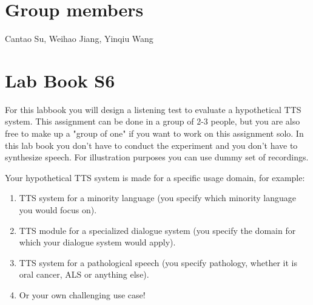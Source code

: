 \documentclass{../labbook}
\begin{document}
\section{Group members}
Cantao Su, Weihao Jiang, Yinqiu Wang

\section{Lab Book S6}
\noindent 
For this labbook you will design a listening test to evaluate a hypothetical TTS system. This assignment can be done in a group of 2-3 people, but you are also free to make up a "group of one" if you want to work on this assignment solo.
In this lab book you don't have to conduct the experiment and you don't have to synthesize speech. For illustration purposes you can use dummy set of recordings. 
\bigskip

\noindent Your hypothetical TTS system is made for a specific usage domain, for example:
\begin{enumerate}
    \item TTS system for a minority language (you specify which minority language you would focus on). 
    \item TTS module for a specialized dialogue system (you specify the domain for which your dialogue system would apply).
    \item TTS system for a pathological speech (you specify pathology, whether it is oral cancer, ALS or anything else).
    \item Or your own challenging use case!
\end{enumerate}
\end{document}
